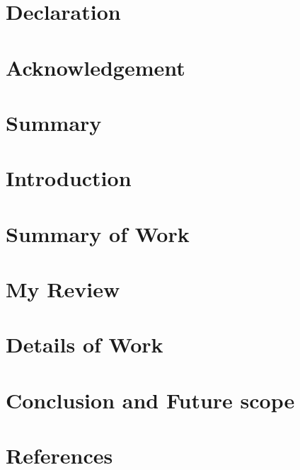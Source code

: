 \documentclass[12pt]{report}
\begin{document}




\chapter*{Declaration}


\chapter*{Acknowledgement}



\tableofcontents

\clearpage
{}

\chapter{Summary}

\chapter{Introduction}

\chapter{Summary of Work}

\chapter{My Review}

\chapter{Details of Work}

\chapter{Conclusion and Future scope}

\chapter{References}

\end{document}
